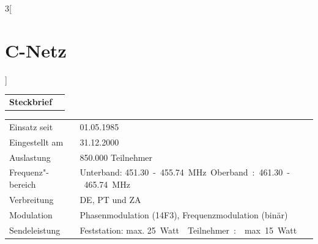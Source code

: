 \begin{multicols}{3}[\section{C-Netz}]


\newrefsegment

\begin{tabular}{p{}p{2.7 cm}}
\textbf{Steckbrief}& \\
\end{tabular}
\begin{tabular}{p{}p{2.7 cm}}
      Einsatz seit & 01.05.1985\\
	  Eingestellt am & 31.12.2000\\
	  Auslastung & 850.000 Teilnehmer\\
      Frequenz"-bereich  & Unterband: \SI{451,30}-\SI{455,74}{\mega\hertz}
						   Oberband: \SI{461,30}-\SI{465,74}{\mega\hertz} \\
      Verbreitung & DE, PT und ZA\\
      Modulation & Phasenmodulation (14F3), \newline
	               Frequenzmodulation (binär)\\
      Sendeleistung & Feststation: \newline max. \SI{25} Watt \newline
				      Teilnehmer: \newline max. \SI{15} Watt\\
\end{tabular}
\par

\end{multicols}
